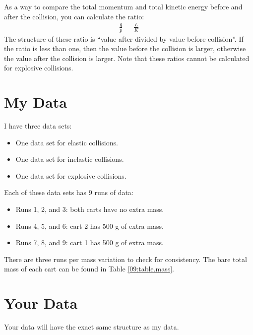 As a way to compare the total momentum and total kinetic energy before and after the collision, you can calculate the ratio:
\begin{align}
    \frac{q}{p} && \frac{L}{K}
\end{align}
The structure of these ratio is ``value after divided by value before collision''. If the ratio is less than one, then the value before the collision is larger, otherwise the value after the collision is larger. Note that these ratios cannot be calculated for explosive collisions.
\section{My Data}
I have three data sets:
\begin{itemize}
    \item One data set for elastic collisions.
    \item One data set for inelastic collisions.
    \item One data set for explosive collisions.
\end{itemize}
Each of these data sets has 9 runs of data:
\begin{itemize}
    \item Runs 1, 2, and 3: both carts have no extra mass.
    \item Runs 4, 5, and 6: cart 2 has 500 g of extra mass.
    \item Runs 7, 8, and 9: cart 1 has 500 g of extra mass.
\end{itemize}
There are three runs per mass variation to check for consistency. The bare total mass of each cart can be found in Table \ref{09:table.mass}.
\section{Your Data}
Your data will have the exact same structure as my data.
\newpage
